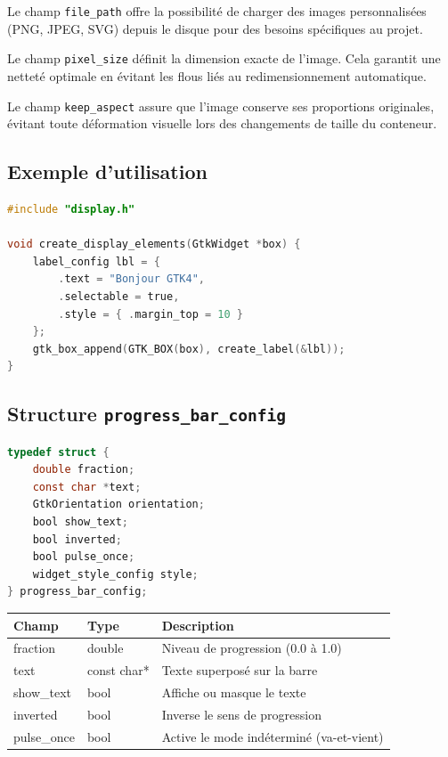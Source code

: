Le champ \texttt{file\_path} offre la possibilité de charger des images personnalisées (PNG, JPEG, SVG) depuis le disque pour des besoins spécifiques au projet.

Le champ \texttt{pixel\_size} définit la dimension exacte de l'image. Cela garantit une netteté optimale en évitant les flous liés au redimensionnement automatique.

Le champ \texttt{keep\_aspect} assure que l'image conserve ses proportions originales, évitant toute déformation visuelle lors des changements de taille du conteneur.

\subsection{Exemple d'utilisation}
\begin{lstlisting}[language=C]
#include "display.h"

void create_display_elements(GtkWidget *box) {
    label_config lbl = {
        .text = "Bonjour GTK4",
        .selectable = true,
        .style = { .margin_top = 10 }
    };
    gtk_box_append(GTK_BOX(box), create_label(&lbl));
}
\end{lstlisting}
\subsection{Structure \texttt{progress\_bar\_config}}
\begin{lstlisting}[language=C]
typedef struct {
    double fraction;
    const char *text;
    GtkOrientation orientation;
    bool show_text;
    bool inverted;
    bool pulse_once;
    widget_style_config style;
} progress_bar_config;
\end{lstlisting}
\begin{center}
\begin{tabular}{|l|l|p{5cm}|}
\hline
\textbf{Champ} & \textbf{Type} & \textbf{Description} \\
\hline
fraction & double & Niveau de progression (0.0 à 1.0) \\
\hline
text & const char* & Texte superposé sur la barre \\
\hline
show\_text & bool & Affiche ou masque le texte \\
\hline
inverted & bool & Inverse le sens de progression \\
\hline
pulse\_once & bool & Active le mode indéterminé (va-et-vient) \\
\hline
\end{tabular}
\end{center}


